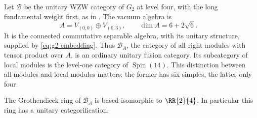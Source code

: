 Let $\mathcal B$ be the unitary WZW category of $G_2$ at level four,
with the long fundamental weight first, as in \cite{CRT}. The vacuum
algebra is
\[
 A=V_{(0,0)}\oplus V_{(0,3)},\qquad
 \dim A=6+2\sqrt6.
\]
It is the connected commutative separable algebra, with its unitary
structure, supplied by \eqref{eq:g2-embedding}. Thus $\mathcal B_A$,
the category of all right modules with tensor product over $A$, is an
ordinary unitary fusion category. Its subcategory of local modules is
the level-one category of $\operatorname{Spin}(14)$.
This distinction between all modules and local modules matters: the
former has six simples, the latter only four.

\begin{proposition}\label{prop:g2-e4}
The Grothendieck ring of $\mathcal B_A$ is based-isomorphic to
$\RR{2}{4}$. In particular this ring has a unitary categorification.
\end{proposition}
